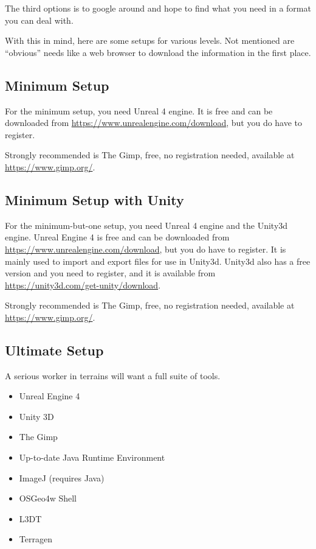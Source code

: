 \documentclass[letter,12pt]{article}
\begin{document}
The third options is to google around and hope to find what you need in a format you can deal with.

With this in mind, here are some setups for various levels.  Not mentioned are “obvious” needs like a web browser to download the information in the first place.

\subsection{Minimum Setup}

For the minimum setup, you need Unreal 4 engine.  It is free and can be downloaded from \url{https://www.unrealengine.com/download}, but you do have to register.

Strongly recommended is The Gimp, free, no registration needed, available at \url{https://www.gimp.org/}.

\subsection{Minimum Setup with Unity}

For the minimum-but-one setup, you need Unreal 4 engine and the Unity3d engine.  Unreal Engine 4 is free and can be downloaded from \url{https://www.unrealengine.com/download}, but you do have to register.  It is mainly used to import and export files for use in Unity3d.  Unity3d also has a free version and you need to register, and it is available from \url{https://unity3d.com/get-unity/download}.  

Strongly recommended is The Gimp, free, no registration needed, available at \url{https://www.gimp.org/}.

\subsection{Ultimate Setup}

A serious worker in terrains will want a full suite of tools.  

\begin{itemize}
\item Unreal Engine 4
\item Unity 3D
\item The Gimp
\item Up-to-date Java Runtime Environment
\item ImageJ (requires Java)
\item OSGeo4w Shell
\item L3DT 
\item Terragen
\end{itemize}
\end{document}
